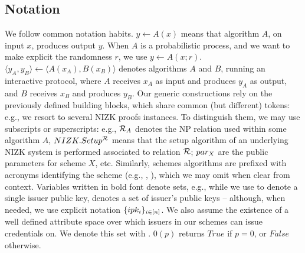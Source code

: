 \subsection{Notation}
\label{ssec:notation}

We follow common notation habits. $y \gets A(x)$ means that algorithm $A$, on
input $x$, produces output $y$. When $A$ is a probabilistic process, and we want
to make explicit the randomness $r$, we use $y \gets A(x;r)$. $\langle y_A,y_B
\rangle \gets \langle A(x_A),B(x_B)\rangle$ denotes algorithms $A$ and $B$,
running an interactive protocol, where $A$ receives $x_A$ as input and produces
$y_A$ as output, and $B$ receives $x_B$ and produces $y_B$.
%
Our generic constructions rely on the previously defined building blocks, which
share common (but different)
tokens: e.g., we resort to several NIZK proofs instances. To distinguish
them, we may use subscripts or superscripts: e.g., $\mathcal{R}_A$ denotes the
NP relation used within some algorithm $A$, $NIZK.Setup^{\mathcal{R}}$ means that
the setup algorithm of an underlying NIZK system is performed associated to
relation $\mathcal{R}$; $par_X$ are the public parameters for scheme $X$, etc.
Similarly, schemes algorithms are prefixed with acronyms identifying the scheme
(e.g., \ESetup, \NIZKSetup), which we may omit when clear from context.
Variables written in bold font denote sets, e.g., while we use \ipk to denote a
single issuer public key, \sipk denotes a set of issuer's public keys --
although, when needed, we use explicit notation $\lbrace ipk_i
\rbrace_{i\in[n]}$.
%
We also assume the existence of a well defined attribute space over which
issuers in our schemes can issue credentials on. We denote this set with
\AttrSpace.
%
$0(p)$ returns $True$ if $p=0$, or $False$ otherwise.

